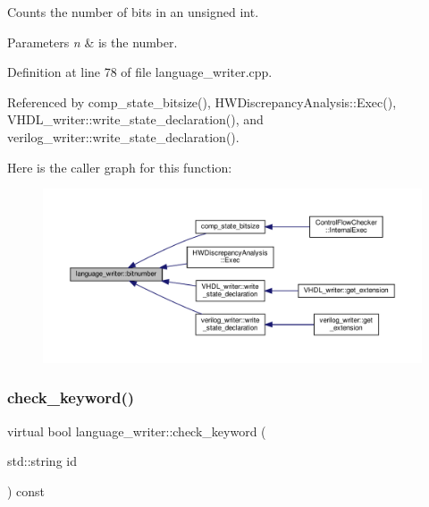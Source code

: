 Counts the number of bits in an unsigned int. 


\begin{DoxyParams}{Parameters}
{\em n} & is the number. \\
\hline
\end{DoxyParams}


Definition at line 78 of file language\+\_\+writer.\+cpp.



Referenced by comp\+\_\+state\+\_\+bitsize(), H\+W\+Discrepancy\+Analysis\+::\+Exec(), V\+H\+D\+L\+\_\+writer\+::write\+\_\+state\+\_\+declaration(), and verilog\+\_\+writer\+::write\+\_\+state\+\_\+declaration().

Here is the caller graph for this function\+:
\nopagebreak
\begin{figure}[H]
\begin{center}
\leavevmode
\includegraphics[width=350pt]{d6/d67/classlanguage__writer_a966840e95ec2f66d5128d6cbc54b89bb_icgraph}
\end{center}
\end{figure}
\mbox{\label{classlanguage__writer_a5a69f96be3c6c3cab69325058c077d21}} 
\subsubsection{\texorpdfstring{check\+\_\+keyword()}{check\_keyword()}}
{\footnotesize\ttfamily virtual bool language\+\_\+writer\+::check\+\_\+keyword (\begin{DoxyParamCaption}\item[{std\+::string}]{id }\end{DoxyParamCaption}) const\hspace{0.3cm}{\ttfamily [pure virtual]}}



